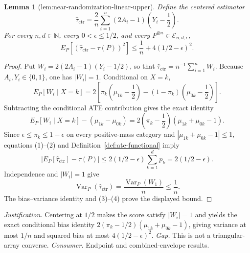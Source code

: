 \documentclass{article}
\newtheorem{lemma}{Lemma}
\begin{document}
\begin{lemma}[lem:near-randomization-linear-upper]\label{lem:near-randomization-linear-upper}
Define the centered estimator
\[
\widehat\tau_{\mathrm{ctr}}=\frac2n\sum_{i=1}^n(2A_i-1)\left(Y_i-\frac12\right).
\]
For every \(n,d\in\mathbb N\), every \(0<\epsilon\le1/2\), and every \(P^{\otimes n}\in\mathcal E_{n,d,\epsilon}\),
\[
E_P[(\widehat\tau_{\mathrm{ctr}}-\tau(P))^2]\le\frac1n+4(1/2-\epsilon)^2.
\]
\end{lemma}
\begin{proof}
Put \(W_i=2(2A_i-1)(Y_i-1/2)\), so that \(\widehat\tau_{\mathrm{ctr}}=n^{-1}\sum_{i=1}^nW_i\). Because \(A_i,Y_i\in\{0,1\}\), one has \(|W_i|=1\). Conditional on \(X=k\),
\[
E_P[W_i\mid X=k]=2\left[\pi_k\left(\mu_{1k}-\frac12\right)-(1-\pi_k)\left(\mu_{0k}-\frac12\right)\right].
\tag{1}
\]
Subtracting the conditional ATE contribution gives the exact identity
\[
E_P[W_i\mid X=k]-(\mu_{1k}-\mu_{0k})
=2\left(\pi_k-\frac12\right)(\mu_{1k}+\mu_{0k}-1).
\tag{2}
\]
Since \(\epsilon\le\pi_k\le1-\epsilon\) on every positive-mass category and \(|\mu_{1k}+\mu_{0k}-1|\le1\), equations (1)--(2) and Definition~\ref{def:ate-functional} imply
\[
\left|E_P[\widehat\tau_{\mathrm{ctr}}]-\tau(P)\right|
\le2(1/2-\epsilon)\sum_{k=1}^dp_k
=2(1/2-\epsilon).
\tag{3}
\]
Independence and \(|W_i|=1\) give
\[
\operatorname{Var}_P(\widehat\tau_{\mathrm{ctr}})=\frac{\operatorname{Var}_P(W_1)}n\le\frac1n.
\tag{4}
\]
The bias--variance identity and (3)--(4) prove the displayed bound.
\end{proof}
\par\smallskip\noindent \textit{Justification.} Centering at \(1/2\) makes the score satisfy \(|W_i|=1\) and yields the exact conditional bias identity \(2(\pi_k-1/2)(\mu_{1k}+\mu_{0k}-1)\), giving variance at most \(1/n\) and squared bias at most \(4(1/2-\epsilon)^2\). \textit{Gap.} This is not a triangular-array converse. \textit{Consumer.} Endpoint and combined-envelope results.
\end{document}
